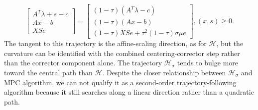 \documentclass[a4paper,10 pt,titlepage,twoside]{book}
\theoremstyle{plain}
\theoremstyle{definition}
\theoremstyle{remark}
\begin{document}
\begin{equation}\label{T}
\begin{bmatrix}
A^{T}\lambda+s-c \\Ax-b \\XSe
\end{bmatrix}=\begin{bmatrix}
(1-\tau)(A^{T}\lambda-c)\\(1-\tau)(Ax-b)\\(1-\tau)XSe+\tau^{2}(1-\tau)\sigma\mu e
\end{bmatrix},(x,s)\geq0.
\end{equation}
The tangent to this trajectory is the affine-scaling direction, as for $\mathcal{H}$, but the curvature can be identified with the combined centering-corrector step rather than the corrector component alone. The trajectory $\mathcal{H}_{\sigma}$ tends to bulge more toward the central path than $\mathcal{H}$. Despite the closer relationship between $\mathcal{H}_{\sigma}$  and MPC algorithm, we can not qualify it as a second-order trajectory-following algorithm because it still searches along a linear direction rather than a quadratic path.  
\end{document}
